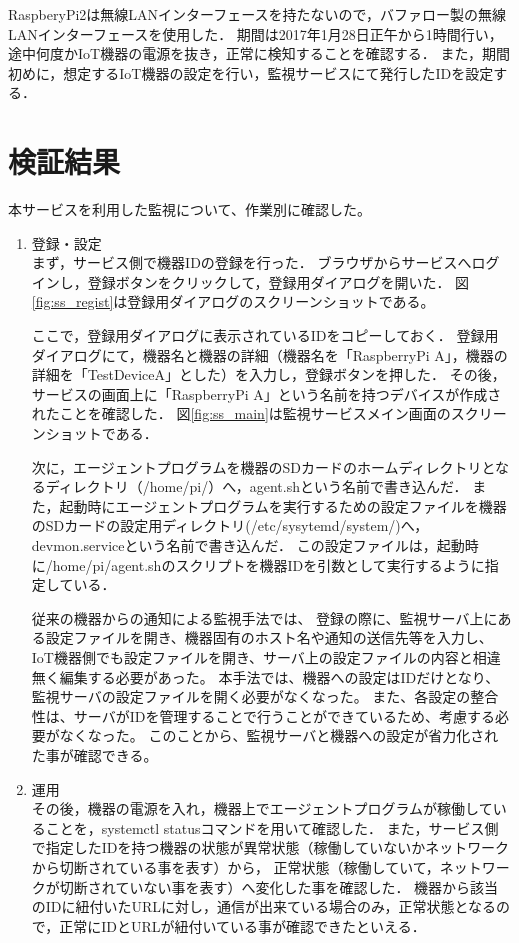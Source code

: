 RaspberyPi2は無線LANインターフェースを持たないので，バファロー製の無線LANインターフェースを使用した．
期間は2017年1月28日正午から1時間行い，途中何度かIoT機器の電源を抜き，正常に検知することを確認する．
また，期間初めに，想定するIoT機器の設定を行い，監視サービスにて発行したIDを設定する．

\section{検証結果}
本サービスを利用した監視について、作業別に確認した。
\begin{enumerate}

\item 登録・設定\\
まず，サービス側で機器IDの登録を行った．
ブラウザからサービスへログインし，登録ボタンをクリックして，登録用ダイアログを開いた．
図\ref{fig:ss_regist}は登録用ダイアログのスクリーンショットである。

ここで，登録用ダイアログに表示されているIDをコピーしておく．
登録用ダイアログにて，機器名と機器の詳細（機器名を「RaspberryPi A」，機器の詳細を「TestDeviceA」とした）を入力し，登録ボタンを押した．
その後，サービスの画面上に「RaspberryPi A」という名前を持つデバイスが作成されたことを確認した．
図\ref{fig:ss_main}は監視サービスメイン画面のスクリーンショットである．
\medskip

次に，エージェントプログラムを機器のSDカードのホームディレクトリとなるディレクトリ（/home/pi/）へ，agent.shという名前で書き込んだ．
また，起動時にエージェントプログラムを実行するための設定ファイルを機器のSDカードの設定用ディレクトリ(/etc/sysytemd/system/)へ，devmon.serviceという名前で書き込んだ．
この設定ファイルは，起動時に/home/pi/agent.shのスクリプトを機器IDを引数として実行するように指定している．
\medskip

従来の機器からの通知による監視手法では、
登録の際に、監視サーバ上にある設定ファイルを開き、機器固有のホスト名や通知の送信先等を入力し、IoT機器側でも設定ファイルを開き、サーバ上の設定ファイルの内容と相違無く編集する必要があった。
本手法では、機器への設定はIDだけとなり、監視サーバの設定ファイルを開く必要がなくなった。
また、各設定の整合性は、サーバがIDを管理することで行うことができているため、考慮する必要がなくなった。
このことから、監視サーバと機器への設定が省力化された事が確認できる。

\item 運用\\
その後，機器の電源を入れ，機器上でエージェントプログラムが稼働していることを，systemctl statusコマンドを用いて確認した．
また，サービス側で指定したIDを持つ機器の状態が異常状態（稼働していないかネットワークから切断されている事を表す）から，
正常状態（稼働していて，ネットワークが切断されていない事を表す）へ変化した事を確認した．
機器から該当のIDに紐付いたURLに対し，通信が出来ている場合のみ，正常状態となるので，正常にIDとURLが紐付いている事が確認できたといえる．


\end{enumerate}
